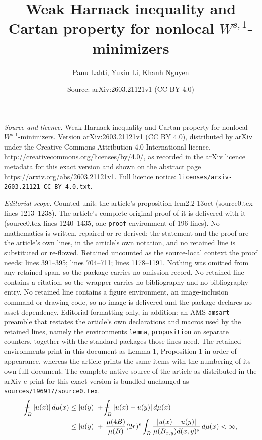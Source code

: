 \documentclass[10pt,a4paper]{amsart}
\title{Weak Harnack inequality and Cartan property for nonlocal $W^{s,1}$-minimizers}
\author{Panu Lahti, Yuxin Li, Khanh Nguyen}
\date{Source: arXiv:2603.21121v1 (CC BY 4.0)}
\def\XXint#1#2#3{{\setbox0=\hbox{$#1{#2#3}{\int}$ }
		\vcenter{\hbox{$#2#3$ }}\kern-.6\wd0}}
\def\Xint#1{\mathchoice
	{\XXint\displaystyle\textstyle{#1}}
	{\XXint\textstyle\scriptstyle{#1}}
	{\XXint\scriptstyle\scriptscriptstyle{#1}}
	{\XXint\scriptscriptstyle\scriptscriptstyle{#1}}
	\!\int}
\def\dashint{\Xint-}
\begin{document}
\maketitle

\noindent\emph{Source and licence.} Weak Harnack inequality and Cartan property for nonlocal $W^{s,1}$-minimizers. Version arXiv:2603.21121v1 (CC BY 4.0), distributed by arXiv under the Creative Commons Attribution 4.0 International licence, http://creativecommons.org/licenses/by/4.0/, as recorded in the arXiv licence metadata for this exact version and shown on the abstract page https://arxiv.org/abs/2603.21121v1. Full licence notice: \texttt{licenses/arxiv-2603.21121-CC-BY-4.0.txt}.\par\smallskip

\noindent\textit{Editorial scope.} Counted unit: the article's proposition lem2.2-13oct (source0.tex lines 1213--1238). The article's complete original proof of it is delivered with it (source0.tex lines 1240--1435, one \texttt{proof} environment of 196 lines). No mathematics is written, repaired or re-derived: the statement and the proof are the article's own lines, in the article's own notation, and no retained line is substituted or re-flowed.  Retained uncounted as the source-local context the proof needs: lines 391--395; lines 704--711; lines 1178--1191.  Nothing was omitted from any retained span, so the package carries no omission record.  No retained line contains a citation, so the wrapper carries no bibliography and no bibliography entry.  No retained line contains a figure environment, an image-inclusion command or drawing code, so no image is delivered and the package declares no asset dependency.  Editorial formatting only, in addition: an AMS \texttt{amsart} preamble that restates the article's own declarations and macros used by the retained lines, namely the environments \texttt{lemma}, \texttt{proposition} on separate counters, together with the standard packages those lines need.  The retained environments print in this document as Lemma 1, Proposition 1 in order of appearance, whereas the article prints the same items with the numbering of its own full document.  The complete native source of the article as distributed in the arXiv e-print for this exact version is bundled unchanged as \texttt{sources/196917/source0.tex}.
	\begin{align}\label{eq2.1-11dec}
		\dashint_B |u(x)|\,d\mu(x)
		&\leq  |u(y)|+\dashint_{B} {|u(x)-u(y)|}\,d\mu(x)\\
		&\leq |u(y)|+\, \frac{\mu(4B) }{\mu(B)}(2r)^s\int_{B} \frac{|u(x)-u(y)|}{\mu(B_{x,y})d(x,y)^s}\,d\mu(x)<\infty,  \notag
	\end{align}
\end{document}

